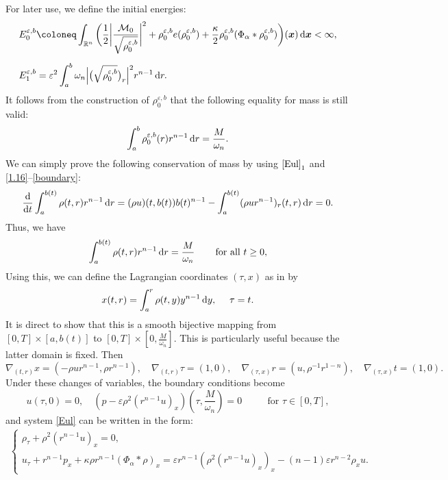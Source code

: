 \documentclass[reqno,11pt]{amsart}
\numberwithin{equation}{section}
\theoremstyle{definition}
\def\v{\varepsilon}
\def\d{{\rm d}}
\def\dd{{\, \rm d}}
\def\M{{\mathcal{M}}}
\begin{document}
 For later use, we define the initial energies:
 \begin{align*}
    &E_0^{\v,b} \coloneq
            \int_{\mathbb{R}^n} \bigg ( \frac{1}{2}\bigg | \frac{\M_0}{\sqrt{\rho_0^{\v,b}}} \bigg |^2 
            + \rho_0^{\v,b} e(\rho_0^{\v,b}) 
            + \frac{\kappa}{2}\rho_0^{\v,b}(\Phi_\alpha *\rho_0^{\v,b})\bigg)(\boldsymbol{x}) \dd \boldsymbol{x} < \infty,\\[2mm]
      &E^{\v,b}_1 = \v^2 \int^b_a \omega_n \Big| \big( \sqrt{\rho^{\v,b}_0} \big)_r \Big|^2 r^{n-1} \dd r.
    \end{align*}
It follows from the construction of $\rho^{\v,b}_0$ that the following equality for mass is still valid:
    \begin{equation*}
 \int^b_a \rho^{\v,b}_0(r) r^{n-1} \dd r = \frac{M}{\omega_n}.
    \end{equation*}
We can simply prove the following conservation of mass 
by using $\eqref{Eul}_1$ and \eqref{1.16}--\eqref{boundary}: 
    \begin{equation*}
 \frac{\d}{\d t} \int^{b(t)}_a \rho(t,r) r^{n-1} \dd r = (\rho u)(t,b(t))b(t)^{n-1} - \int^{b(t)}_a (\rho u r^{n-1})_r(t,r) \dd r = 0.
    \end{equation*}
Thus, we have 
\begin{equation*}
\int^{b(t)}_a \rho(t,r) r^{n-1} \dd r = \frac{M}{\omega_n}\qquad\,\mbox{for all $t \geq 0$},
\end{equation*}
Using this, we can define the Lagrangian coordinates $(\tau,x)$ as in \cite{Chen2021} by
    \begin{equation*}
 x(t,r) = \int^r_a \rho (t,y) y^{n-1} \dd y, \quad\,\, \tau = t.
    \end{equation*}
It is direct to show that this is a smooth bijective mapping from $[0, T] \times [a,b(t)]$ 
to $[0, T] \times [0, \frac{M}{\omega_n}]$. 
This is particularly useful because the latter domain is fixed. Then 
\begin{equation*}
\nabla_{(t,r)} x = (-\rho u r^{n-1},\rho r^{n-1}), \quad \nabla_{(t,r)} \tau = (1,0), 
\quad \nabla_{(\tau,x)} r = (u, \rho^{-1}r^{1-n}), \quad \nabla_{(\tau,x)} t = (1,0).
\end{equation*}
Under these changes of variables, the boundary conditions become
\begin{equation*}
u(\tau,0) = 0, \quad (p-\varepsilon\rho^2(r^{n-1}u)_x)(\tau,\frac{M}{\omega_n}) = 0 
\qquad\,\, \text{ for $\tau \in [0,T]$},
\end{equation*}
and system \eqref{Eul}
can be written in the form:
    \begin{align*}
    \begin{cases}
  \rho_\tau + \rho^2(r^{n-1}u)_x = 0,\\[1mm]
  u_\tau + r^{n-1}p_x + \kappa \rho r^{n-1}(\Phi_{\alpha} * \rho)_x = \varepsilon r^{n-1}(\rho^2(r^{n-1}u)_x)_x - (n-1)\varepsilon r^{n-2}\rho_xu.
    \end{cases}
    \end{align*}
\end{document}
